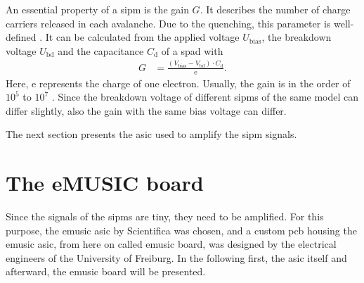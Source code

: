 


An essential property of a \ac{sipm} is the gain $G$.
It describes the number of charge carriers released in each avalanche.
Due to the quenching, this parameter is well-defined \cite{}.
It can be calculated from the applied voltage $U_\text{bias}$, the breakdown voltage $U_\text{bd}$ and the capacitance $C_\text{d}$ of a \ac{spad} with
\begin{align}
	G &= \frac{(V_\text{bias}- V_\text{bd})\cdot C_\text{d}}{\text{e}}.
\end{align}
Here, e represents the charge of one electron.
Usually, the gain is in the order of $10^5$ to $10^7$ \cite{nucl}.
Since the breakdown voltage of different \acp{sipm} of the same model can differ slightly, also the gain with the same bias voltage can differ.

The next section presents the \ac{asic} used to amplify the \ac{sipm} signals.


\section{The eMUSIC board}
Since the signals of the \acp{sipm} are tiny, they need to be amplified.
For this purpose, the \ac{emusic} \ac{asic} by Scientifica was chosen, and a custom \ac{pcb} housing the \ac{emusic} \ac{asic}, from here on called \ac{emusic} board, was designed by the electrical engineers of the University of Freiburg.
In the following first, the \ac{asic} itself and afterward, the \ac{emusic} board will be presented.

